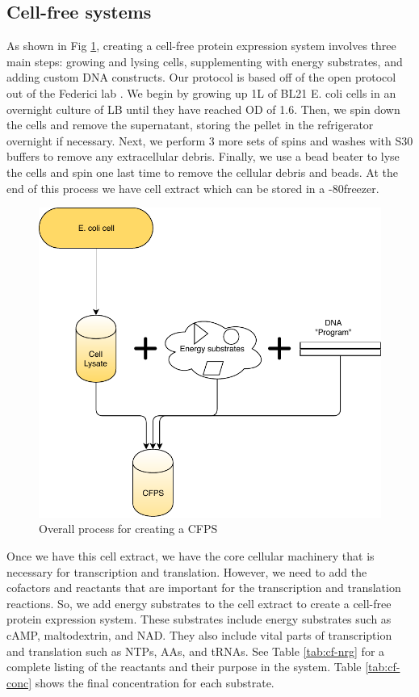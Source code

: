 \subsection{Cell-free systems}
As shown in Fig \ref{fig:cfps}, creating a cell-free protein expression system involves three main steps: growing and lysing cells, supplementing with energy substrates, and adding custom DNA constructs.
Our protocol is based off of the open protocol out of the Federici lab \cite{medina2017cfps}.
We begin by growing up 1L of BL21 E. coli cells in an overnight culture of LB until they have reached OD of 1.6.
Then, we spin down the cells and remove the supernatant, storing the pellet in the refrigerator overnight if necessary.
Next, we perform 3 more sets of spins and washes with S30 buffers to remove any extracellular debris.
Finally, we use a bead beater to lyse the cells and spin one last time to remove the cellular debris and beads.
At the end of this process we have cell extract which can be stored in a -80\degree freezer.
\begin{figure}[t!]
\begin{center}
\includegraphics{figs/CellFreeSetup.pdf}
\caption{Overall process for creating a CFPS}
\end{center}
\label{fig:cfps}
\end{figure}

Once we have this cell extract, we have the core cellular machinery that is necessary for transcription and translation.
However, we need to add the cofactors and reactants that are important for the transcription and translation reactions.
So, we add energy substrates to the cell extract to create a cell-free protein expression system.
These substrates include energy substrates such as cAMP, maltodextrin, and NAD.
They also include vital parts of transcription and translation such as NTPs, AAs, and tRNAs.
See Table \ref{tab:cf-nrg} for a complete listing of the reactants and their purpose in the system.
Table \ref{tab:cf-conc} shows the final concentration for each substrate.


